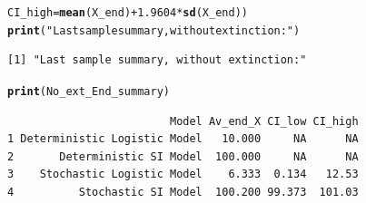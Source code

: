 \documentclass{article}\usepackage[]{graphicx}\usepackage[]{color}
\makeatletter
\newcommand{\hlnum}[1]{\textcolor[rgb]{0.686,0.059,0.569}{#1}}%
\newcommand{\hlstr}[1]{\textcolor[rgb]{0.192,0.494,0.8}{#1}}%
\newcommand{\hlopt}[1]{\textcolor[rgb]{0,0,0}{#1}}%
\newcommand{\hlstd}[1]{\textcolor[rgb]{0.345,0.345,0.345}{#1}}%
\newcommand{\hlkwc}[1]{\textcolor[rgb]{0.333,0.667,0.333}{#1}}%
\newcommand{\hlkwd}[1]{\textcolor[rgb]{0.737,0.353,0.396}{\textbf{#1}}}%
\newenvironment{kframe}{%
 \def\at@end@of@kframe{}%
 \ifinner\ifhmode%
  \def\at@end@of@kframe{\end{minipage}}%
  \begin{minipage}{\columnwidth}%
 \fi\fi%
 \def\FrameCommand##1{\hskip\@totalleftmargin \hskip-\fboxsep
 \colorbox{shadecolor}{##1}\hskip-\fboxsep
     \hskip-\linewidth \hskip-\@totalleftmargin \hskip\columnwidth}%
 \MakeFramed {\advance\hsize-\width
   \@totalleftmargin\z@ \linewidth\hsize
   \@setminipage}}%
 {\par\unskip\endMakeFramed%
 \at@end@of@kframe}
\newenvironment{knitrout}{}{} %
\makeatother
\begin{document}
\begin{knitrout}
\begin{kframe}
\begin{alltt}
    \hlkwc{CI_high} \hlstd{=} \hlkwd{mean}\hlstd{(X_end)} \hlopt{+} \hlnum{1.9604} \hlopt{*} \hlkwd{sd}\hlstd{(X_end))}
\hlkwd{print}\hlstd{(}\hlstr{"Last sample summary, without extinction:"}\hlstd{)}
\end{alltt}
\begin{verbatim}
[1] "Last sample summary, without extinction:"
\end{verbatim}
\begin{alltt}
\hlkwd{print}\hlstd{(No_ext_End_summary)}
\end{alltt}
\begin{verbatim}
                         Model Av_end_X CI_low CI_high
1 Deterministic Logistic Model   10.000     NA      NA
2       Deterministic SI Model  100.000     NA      NA
3    Stochastic Logistic Model    6.333  0.134   12.53
4          Stochastic SI Model  100.200 99.373  101.03
\end{verbatim}
\end{kframe}
\end{knitrout}
\end{document}
